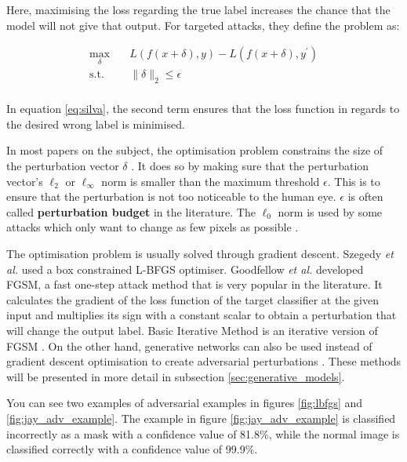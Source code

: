 Here, maximising the loss regarding the true label increases the chance that the model will not give that output. For targeted attacks, they define the problem as:

\begin{equation}
\label{eq:silva}
\begin{aligned}
\max_{\delta} \quad & L(f(x + \delta), y) - L(f(x + \delta), y^\prime)\\
\textrm{s.t.} \quad& \|\delta\|_2\leq\epsilon   \\
\end{aligned}
\end{equation}

In equation \ref{eq:silva}, the second term ensures that the loss function in regards to the desired wrong label is minimised.

In most papers on the subject, the optimisation problem constrains the size of the perturbation vector $\delta$ \cite{akhtar, silva_survey, tnnls_survey}. It does so by making sure that the perturbation vector's $\ell_2$ or $\ell_\infty$ norm is smaller than the maximum threshold $\epsilon$. This is to ensure that the perturbation is not too noticeable to the human eye. $\epsilon$ is often called \textbf{perturbation budget} in the literature. The $\ell_0$ norm is used by some attacks which only want to change as few pixels as possible \cite{akhtar} . 

The optimisation problem is usually solved through gradient descent. Szegedy \textit{et al.} \cite{szegedy2014intriguing} used a box constrained L-BFGS optimiser. Goodfellow \textit{et al.} \cite{fgsm} developed FGSM, a fast one-step attack method that is very popular in the literature. It calculates the gradient of the loss function of the target classifier at the given input and multiplies its sign with a constant scalar to obtain a perturbation that will change the output label.  Basic Iterative Method is an iterative version of FGSM \cite{kurakin2016adversarial}. On the other hand, generative networks can also be used instead of gradient descent optimisation to create adversarial perturbations \cite{upset_angri, zheng_black_box_GAN, advGAN}. These methods will be presented in more detail in subsection \ref{sec:generative_models}. 

You can see two examples of adversarial examples in figures \ref{fig:lbfgs} and \ref{fig:jay_adv_example}. The example in figure \ref{fig:jay_adv_example} is classified incorrectly as a mask with a confidence value of 81.8\%, while the normal image is classified correctly with a confidence value of 99.9\%.

